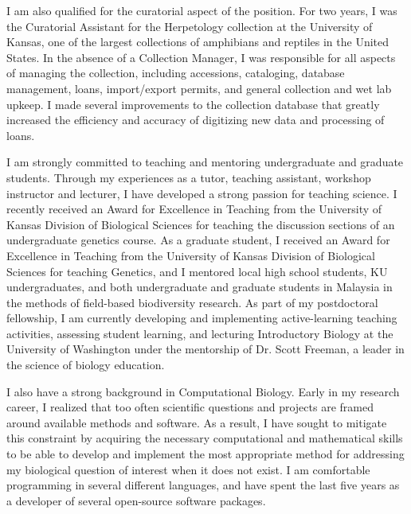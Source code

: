 \documentclass[letterpaper, 10pt]{letter}
\begin{document}
\begin{letter}
I am also qualified for the curatorial aspect of the position.
For two years, I was the Curatorial Assistant for the Herpetology
collection at the University of Kansas, one of the largest collections of
amphibians and reptiles in the United States.
In the absence of a Collection Manager, I was responsible for all aspects
of managing the collection, including accessions, cataloging, database
management, loans, import/export permits, and general collection and wet
lab upkeep.
I made several improvements to the collection database that greatly
increased the efficiency and accuracy of digitizing new data and
processing of loans.

I am strongly committed to teaching and mentoring undergraduate and
graduate students.
Through my experiences as a tutor, teaching assistant, workshop instructor
and lecturer, I have developed a strong passion for teaching science.
I recently received an Award for Excellence in Teaching from the
University of Kansas Division of Biological Sciences for teaching the
discussion sections of an undergraduate genetics course.
As a graduate student, I received an Award for Excellence in Teaching from
the University of Kansas Division of Biological Sciences for teaching
Genetics, and I mentored local high school students, KU undergraduates,
and both undergraduate and graduate students in Malaysia in the methods of
field-based biodiversity research.
As part of my postdoctoral fellowship, I am currently developing and
implementing active-learning teaching activities, assessing student
learning, and lecturing Introductory Biology at the University of
Washington under the mentorship of Dr. Scott Freeman, a leader in the
science of biology education.

I also have a strong background in Computational Biology.
Early in my research career, I realized that too often scientific
questions and projects are framed around available methods and software.
As a result, I have sought to mitigate this constraint by acquiring the
necessary computational and mathematical skills to be able to develop and
implement the most appropriate method for addressing my biological
question of interest when it does not exist.
I am comfortable programming in several different languages, and have
spent the last five years as a developer of several open-source software
packages.



\end{letter}
\end{document}
